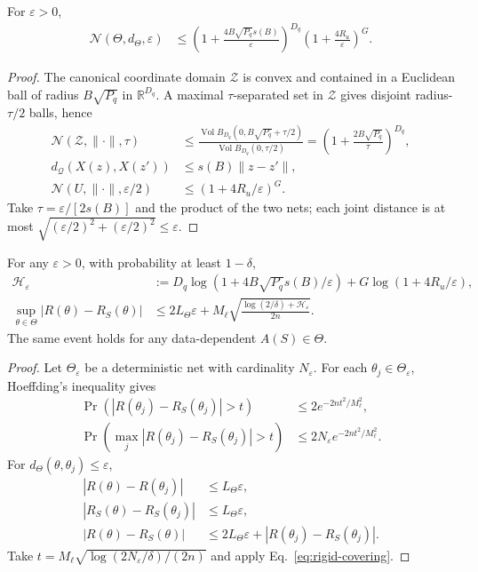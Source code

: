 \begin{lemma}
For $\varepsilon>0$,
\begin{align}\label{eq:rigid-covering}
 \mathcal N(\Theta,d_\Theta,\varepsilon)
 &\le\left(1+\frac{4B\sqrt{P_q}s(B)}\varepsilon\right)^{D_q}
 \left(1+\frac{4R_u}\varepsilon\right)^G.
\end{align}
\end{lemma}
\begin{proof}
The canonical coordinate domain $\mathcal Z$ is convex and contained in a Euclidean ball of radius $B\sqrt{P_q}$ in $\mathbb R^{D_q}$. A maximal $\tau$-separated set in $\mathcal Z$ gives disjoint radius-$\tau/2$ balls, hence
\begin{align}
 \mathcal N(\mathcal Z,\|\cdot\|,\tau)
 &\le\frac{\operatorname{Vol}B_{D_q}(0,B\sqrt{P_q}+\tau/2)}
 {\operatorname{Vol}B_{D_q}(0,\tau/2)}
 =\left(1+\frac{2B\sqrt{P_q}}\tau\right)^{D_q},\\
 d_{\mathcal Q}(X(z),X(z'))&\le s(B)\|z-z'\|,\\
 \mathcal N(U,\|\cdot\|,\varepsilon/2)
 &\le(1+4R_u/\varepsilon)^G.
\end{align}
Take $\tau=\varepsilon/[2s(B)]$ and the product of the two nets; each joint distance is at most $\sqrt{(\varepsilon/2)^2+(\varepsilon/2)^2}\le\varepsilon$.
\end{proof}

\begin{theorem}
\label{thm:rigid-entropy-generalization}
For any $\varepsilon>0$, with probability at least $1-\delta$,
\begin{align}
 \mathcal H_\varepsilon
 &:=D_q\log(1+4B\sqrt{P_q}s(B)/\varepsilon)
 +G\log(1+4R_u/\varepsilon),\\
 \sup_{\theta\in\Theta}|R(\theta)-R_S(\theta)|
 &\le2L_\Theta\varepsilon+
 M_\ell\sqrt{\frac{\log(2/\delta)+\mathcal H_\varepsilon}{2n}}.\label{eq:rigid-entropy-bound}
\end{align}
The same event holds for any data-dependent $A(S)\in\Theta$.
\end{theorem}
\begin{proof}
Let $\Theta_\varepsilon$ be a deterministic net with cardinality $N_\varepsilon$.
For each $\theta_j\in\Theta_\varepsilon$, Hoeffding's inequality gives
\begin{align}
 \Pr(|R(\theta_j)-R_S(\theta_j)|>t)&\le2e^{-2nt^2/M_\ell^2},\\
 \Pr\left(\max_j|R(\theta_j)-R_S(\theta_j)|>t\right)
 &\le2N_\varepsilon e^{-2nt^2/M_\ell^2}.
\end{align}
For $d_\Theta(\theta,\theta_j)\le\varepsilon$,
\begin{align}
 |R(\theta)-R(\theta_j)|&\le L_\Theta\varepsilon,\\
 |R_S(\theta)-R_S(\theta_j)|&\le L_\Theta\varepsilon,\\
 |R(\theta)-R_S(\theta)|
 &\le2L_\Theta\varepsilon+|R(\theta_j)-R_S(\theta_j)|.
\end{align}
Take $t=M_\ell\sqrt{\log(2N_\varepsilon/\delta)/(2n)}$ and apply Eq.~\eqref{eq:rigid-covering}.
\end{proof}

